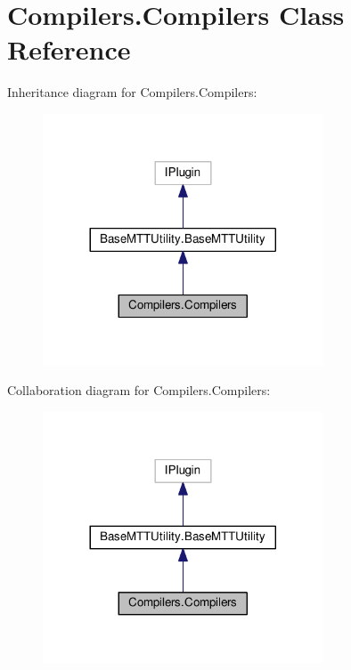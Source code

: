 \hypertarget{classCompilers_1_1Compilers}{\section{Compilers.\-Compilers Class Reference}
\label{classCompilers_1_1Compilers}
}


Inheritance diagram for Compilers.\-Compilers\-:
\nopagebreak
\begin{figure}[H]
\begin{center}
\leavevmode
\includegraphics[width=236pt]{classCompilers_1_1Compilers__inherit__graph}
\end{center}
\end{figure}


Collaboration diagram for Compilers.\-Compilers\-:
\nopagebreak
\begin{figure}[H]
\begin{center}
\leavevmode
\includegraphics[width=236pt]{classCompilers_1_1Compilers__coll__graph}
\end{center}
\end{figure}
